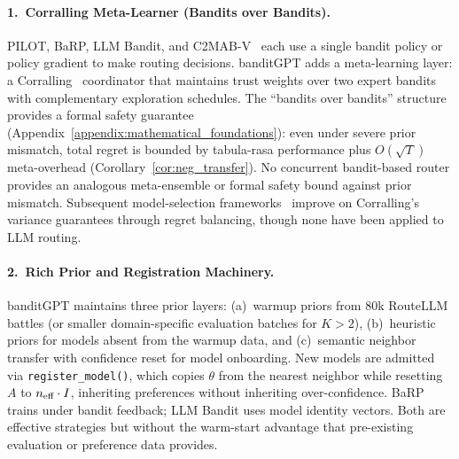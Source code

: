 
\paragraph{1.\ Corralling Meta-Learner (Bandits over Bandits).}
PILOT, BaRP, LLM Bandit, and C2MAB-V~\cite{dai2024c2mab} each use a single
bandit policy or policy gradient to make routing decisions.
banditGPT adds a meta-learning layer: a Corralling~\cite{agarwal2017corralling}
coordinator that maintains trust weights over two expert bandits with
complementary exploration schedules.
The ``bandits over bandits'' structure provides a formal safety guarantee
(Appendix~\ref{appendix:mathematical_foundations}): even under severe prior
mismatch, total regret is bounded by tabula-rasa performance plus
$O(\sqrt{T})$ meta-overhead (Corollary~\ref{cor:neg_transfer}).
No concurrent bandit-based router provides an analogous meta-ensemble or
formal safety bound against prior mismatch.
Subsequent model-selection frameworks~\cite{pacchiano2020model, cutkosky2021dynamic}
improve on Corralling's variance guarantees through regret balancing, though
none have been applied to LLM routing.

\paragraph{2.\ Rich Prior and Registration Machinery.}
banditGPT maintains three prior layers: (a)~warmup priors from 80k RouteLLM
battles (or smaller domain-specific evaluation batches for $K{>}2$),
(b)~heuristic priors for models absent from the warmup data, and
(c)~semantic neighbor transfer with confidence reset for model onboarding.
New models are admitted via \texttt{register\_model()}, which copies $\theta$
from the nearest neighbor while resetting $A$ to $n_{\text{eff}} \cdot I$, inheriting
preferences without inheriting over-confidence.
BaRP trains under bandit feedback; LLM Bandit uses model identity vectors.
Both are effective strategies but without the warm-start advantage that
pre-existing evaluation or preference data provides.

